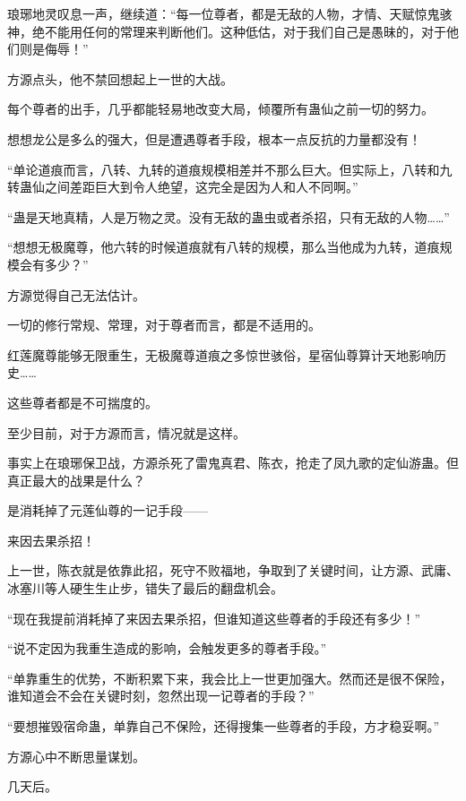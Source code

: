 
\begin{this_body}

琅琊地灵叹息一声，继续道：“每一位尊者，都是无敌的人物，才情、天赋惊鬼骇神，绝不能用任何的常理来判断他们。这种低估，对于我们自己是愚昧的，对于他们则是侮辱！”

方源点头，他不禁回想起上一世的大战。

每个尊者的出手，几乎都能轻易地改变大局，倾覆所有蛊仙之前一切的努力。

想想龙公是多么的强大，但是遭遇尊者手段，根本一点反抗的力量都没有！

“单论道痕而言，八转、九转的道痕规模相差并不那么巨大。但实际上，八转和九转蛊仙之间差距巨大到令人绝望，这完全是因为人和人不同啊。”

“蛊是天地真精，人是万物之灵。没有无敌的蛊虫或者杀招，只有无敌的人物……”

“想想无极魔尊，他六转的时候道痕就有八转的规模，那么当他成为九转，道痕规模会有多少？”

方源觉得自己无法估计。

一切的修行常规、常理，对于尊者而言，都是不适用的。

红莲魔尊能够无限重生，无极魔尊道痕之多惊世骇俗，星宿仙尊算计天地影响历史……

这些尊者都是不可揣度的。

至少目前，对于方源而言，情况就是这样。

事实上在琅琊保卫战，方源杀死了雷鬼真君、陈衣，抢走了凤九歌的定仙游蛊。但真正最大的战果是什么？

是消耗掉了元莲仙尊的一记手段——

来因去果杀招！

上一世，陈衣就是依靠此招，死守不败福地，争取到了关键时间，让方源、武庸、冰塞川等人硬生生止步，错失了最后的翻盘机会。

“现在我提前消耗掉了来因去果杀招，但谁知道这些尊者的手段还有多少！”

“说不定因为我重生造成的影响，会触发更多的尊者手段。”

“单靠重生的优势，不断积累下来，我会比上一世更加强大。然而还是很不保险，谁知道会不会在关键时刻，忽然出现一记尊者的手段？”

“要想摧毁宿命蛊，单靠自己不保险，还得搜集一些尊者的手段，方才稳妥啊。”

方源心中不断思量谋划。

几天后。


\end{this_body}
